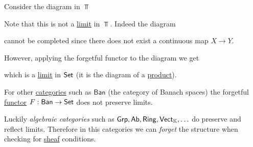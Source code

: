 \documentclass[../../../main]{subfiles}
\begin{document}
Consider the diagram in \(\Top\)
\begin{center}
\end{center}
Note that this is not a \hyperref[def:categorical-limit]{limit} in \(\Top\).
Indeed the diagram
\begin{center}
\end{center}
cannot be completed since there does not exist a continuous map \(X \to Y\).

However, applying the forgetful functor to the diagram we get
\begin{center}
\end{center}
which is a \hyperref[def:categorical-limit]{limit} in \(\mathsf{Set}\) (it is the diagram of a \hyperref[def:categorical-product]{product}).

For other \hyperref[def:category]{categories} such as \(\mathsf{Ban}\) (the category of Banach spaces) the forgetful \hyperref[def:functor]{functor} \(F: \mathsf{Ban} \to \mathsf{Set}\) does not preserve limits.

Luckily \textit{algebraic categories} such as \(\mathsf{Grp}, \mathsf{Ab}, \mathsf{Ring}, \mathsf{Vect}_{\mathbb{K}}, \ldots\) do preserve and reflect limits.
Therefore in this categories we can \textit{forget} the structure when checking for \hyperref[def:sheaf]{sheaf} conditions.
\end{document}
